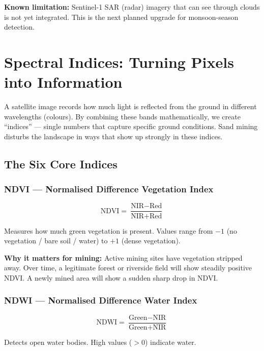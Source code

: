 \documentclass[12pt, a4paper]{article}
\begin{document}
\begin{notebox}
  \textbf{Known limitation:} Sentinel-1 SAR (radar) imagery that can
  see through clouds is not yet integrated. This is the next planned
  upgrade for monsoon-season detection.
\end{notebox}

\section{Spectral Indices: Turning Pixels into Information}

A satellite image records how much light is reflected from the ground
in different wavelengths (colours). By combining these bands
mathematically, we create ``indices'' --- single numbers that capture
specific ground conditions. Sand mining disturbs the landscape in ways
that show up strongly in these indices.

\subsection{The Six Core Indices}

\subsubsection{NDVI --- Normalised Difference Vegetation Index}

\[
  \text{NDVI} = \frac{\text{NIR} - \text{Red}}{\text{NIR} + \text{Red}}
\]

Measures how much green vegetation is present. Values range from $-1$
(no vegetation / bare soil / water) to $+1$ (dense vegetation).

\textbf{Why it matters for mining:} Active mining sites have vegetation
stripped away. Over time, a legitimate forest or riverside field will
show steadily positive NDVI. A newly mined area will show a sudden
sharp drop in NDVI.

\subsubsection{NDWI --- Normalised Difference Water Index}

\[
  \text{NDWI} = \frac{\text{Green} - \text{NIR}}{\text{Green} + \text{NIR}}
\]

Detects open water bodies. High values ($>0$) indicate water.
\end{document}
